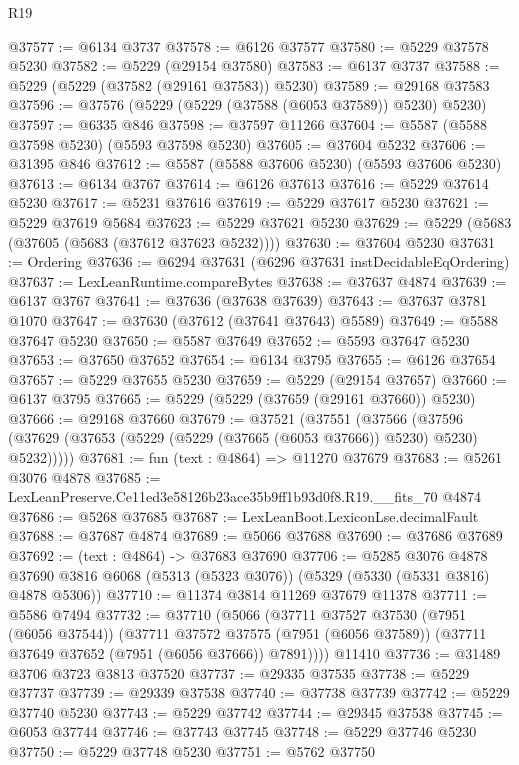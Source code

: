 \begin{lexlean}{R19}
\begin{coremodule}
@37577 := @6134 @3737
@37578 := @6126 @37577
@37580 := @5229 @37578 @5230
@37582 := @5229 (@29154 @37580)
@37583 := @6137 @3737
@37588 := @5229 (@5229 (@37582 (@29161 @37583)) @5230)
@37589 := @29168 @37583
@37596 := @37576 (@5229 (@5229 (@37588 (@6053 @37589)) @5230) @5230)
@37597 := @6335 @846
@37598 := @37597 @11266
@37604 := @5587 (@5588 @37598 @5230) (@5593 @37598 @5230)
@37605 := @37604 @5232
@37606 := @31395 @846
@37612 := @5587 (@5588 @37606 @5230) (@5593 @37606 @5230)
@37613 := @6134 @3767
@37614 := @6126 @37613
@37616 := @5229 @37614 @5230
@37617 := @5231 @37616
@37619 := @5229 @37617 @5230
@37621 := @5229 @37619 @5684
@37623 := @5229 @37621 @5230
@37629 := @5229 (@5683 (@37605 (@5683 (@37612 @37623 @5232))))
@37630 := @37604 @5230
@37631 := Ordering
@37636 := @6294 @37631 (@6296 @37631 instDecidableEqOrdering)
@37637 := LexLeanRuntime.compareBytes
@37638 := @37637 @4874
@37639 := @6137 @3767
@37641 := @37636 (@37638 @37639)
@37643 := @37637 @3781 @1070
@37647 := @37630 (@37612 (@37641 @37643) @5589)
@37649 := @5588 @37647 @5230
@37650 := @5587 @37649
@37652 := @5593 @37647 @5230
@37653 := @37650 @37652
@37654 := @6134 @3795
@37655 := @6126 @37654
@37657 := @5229 @37655 @5230
@37659 := @5229 (@29154 @37657)
@37660 := @6137 @3795
@37665 := @5229 (@5229 (@37659 (@29161 @37660)) @5230)
@37666 := @29168 @37660
@37679 := @37521
    (@37551
      (@37566 (@37596 (@37629 (@37653 (@5229 (@5229 (@37665 (@6053 @37666)) @5230) @5230) @5232)))))
@37681 := fun (text : @4864) => @11270 @37679
@37683 := @5261 @3076 @4878
@37685 := LexLeanPreserve.Ce11ed3e58126b23ace35b9ff1b93d0f8.R19.__fits_70 @4874
@37686 := @5268 @37685
@37687 := LexLeanBoot.LexiconLse.decimalFault
@37688 := @37687 @4874
@37689 := @5066 @37688
@37690 := @37686 @37689
@37692 := (text : @4864) -> @37683 @37690
@37706 := @5285
    @3076
    @4878
    @37690
    @3816
    @6068
    (@5313 (@5323 @3076))
    (@5329 (@5330 (@5331 @3816) @4878 @5306))
@37710 := @11374 @3814 @11269 @37679 @11378
@37711 := @5586 @7494
@37732 := @37710
    (@5066
      (@37711
        @37527
        @37530
        (@7951 (@6056 @37544))
        (@37711
          @37572
          @37575
          (@7951 (@6056 @37589))
          (@37711 @37649 @37652 (@7951 (@6056 @37666)) @7891))))
    @11410
@37736 := @31489 @3706 @3723 @3813 @37520
@37737 := @29335 @37535
@37738 := @5229 @37737
@37739 := @29339 @37538
@37740 := @37738 @37739
@37742 := @5229 @37740 @5230
@37743 := @5229 @37742
@37744 := @29345 @37538
@37745 := @6053 @37744
@37746 := @37743 @37745
@37748 := @5229 @37746 @5230
@37750 := @5229 @37748 @5230
@37751 := @5762 @37750

\end{coremodule}
\end{lexlean}
